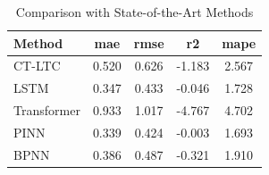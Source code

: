 \begin{table}[htbp]
\centering
\caption{Comparison with State-of-the-Art Methods}
\label{tab:table1_synthetic_results}
\begin{tabular}{lcccc}
\toprule
Method & \textbf{mae} & \textbf{rmse} & \textbf{r2} & \textbf{mape} \\
\midrule
CT-LTC & 0.520 & 0.626 & -1.183 & 2.567 \\
LSTM & 0.347 & 0.433 & -0.046 & 1.728 \\
Transformer & 0.933 & 1.017 & -4.767 & 4.702 \\
PINN & 0.339 & 0.424 & -0.003 & 1.693 \\
BPNN & 0.386 & 0.487 & -0.321 & 1.910 \\
\bottomrule
\end{tabular}
\end{table}